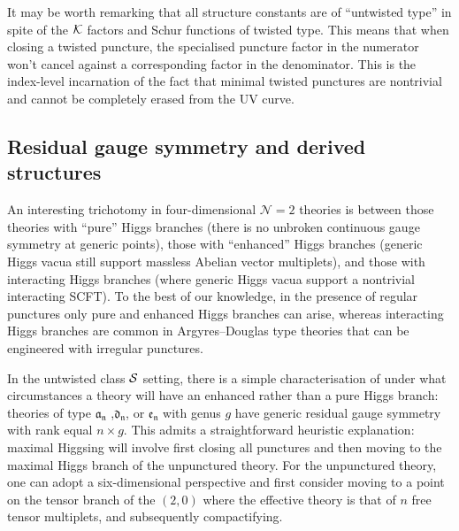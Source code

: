 \documentclass[a4paper]{article}
\def\KK{{\cal K}}
\def\SS{{\cal S}}
\begin{document}
It may be worth remarking that all structure constants are of ``untwisted type'' in spite of the $\KK$ factors and Schur functions of twisted type. This means that when closing a twisted puncture, the specialised puncture factor in the numerator won't cancel against a corresponding factor in the denominator. This is the index-level incarnation of the fact that minimal twisted punctures are nontrivial and cannot be completely erased from the UV curve.

\subsection{\label{ssec:twisted_background/HL}Residual gauge symmetry and derived structures}

An interesting trichotomy in four-dimensional $\mathcal{N}=2$ theories is between those theories with ``pure'' Higgs branches (there is no unbroken continuous gauge symmetry at generic points), those with ``enhanced'' Higgs branches (generic Higgs vacua still support massless Abelian vector multiplets), and those with interacting Higgs branches (where generic Higgs vacua support a nontrivial interacting SCFT). To the best of our knowledge, in the presence of regular punctures only pure and enhanced Higgs branches can arise, whereas interacting Higgs branches are common in Argyres--Douglas type theories that can be engineered with irregular punctures.

In the untwisted class $\SS$ setting, there is a simple characterisation of under what circumstances a theory will have an enhanced rather than a pure Higgs branch: theories of type $\mathfrak{a_n}$ ,$\mathfrak{d_n}$, or $\mathfrak{e_n}$ with genus $g$ have generic residual gauge symmetry with rank equal $n\times g$. This admits a straightforward heuristic explanation: maximal Higgsing will involve first closing all punctures and then moving to the maximal Higgs branch of the unpunctured theory. For the unpunctured theory, one can adopt a six-dimensional perspective and first consider moving to a point on the tensor branch of the $(2,0)$ where the effective theory is that of $n$ free tensor multiplets, and subsequently compactifying.
\end{document}
